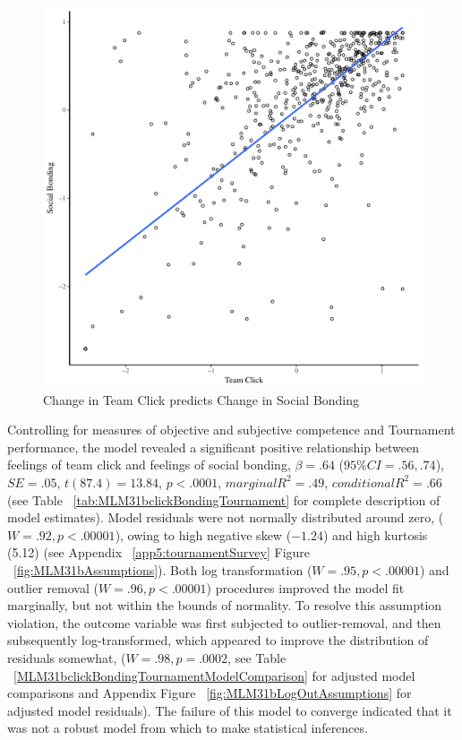         \begin{figure}[htbp]
          \centering
        \includegraphics[scale=.5]{images/clickBondOverallBasicXY.pdf}
          \caption{Change in Team Click predicts Change in Social Bonding}
          \label{fig:clickBondOverallBasicXY}
        \end{figure}

   Controlling for measures of objective and subjective competence and Tournament performance, the model revealed a significant positive relationship between feelings of team click and feelings of social bonding, $\beta = .64$ ($95\% CI = .56, .74$), $SE = .05$, $t(87.4) = 13.84$, $p < .0001$, $marginal R^2 = .49$, $conditional R^2 = .66$ (see Table ~\ref{tab:MLM31bclickBondingTournament} for complete description of model estimates). Model residuals were not normally distributed around zero, ($W = .92, p < .00001$), owing to high negative skew ($-1.24$) and high kurtosis (5.12) (see Appendix ~\ref{app5:tournamentSurvey} Figure ~\ref{fig:MLM31bAssumptions}).
   Both log transformation ($W = .95, p < .00001$) and outlier removal ($W = .96, p < .00001$) procedures improved the model fit marginally, but not within the bounds of normality.  To resolve this assumption violation, the outcome variable was first subjected to outlier-removal, and then subsequently log-transformed, which appeared to improve the distribution of residuals somewhat, ($W = .98, p = .0002$, see Table ~\ref{MLM31bclickBondingTournamentModelComparison} for adjusted model comparisons and Appendix Figure ~\ref{fig:MLM31bLogOutAssumptions} for adjusted model residuals).  The failure of this model to converge indicated that it was not a robust model from which to make statistical inferences.

